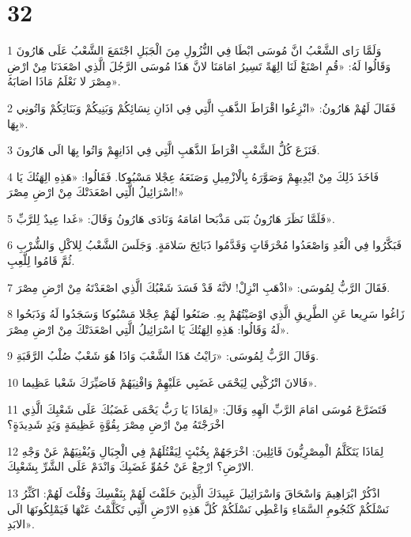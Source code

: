 \chapter{32}

\par 1 وَلَمَّا رَاى الشَّعْبُ انَّ مُوسَى ابْطَا فِي النُّزُولِ مِنَ الْجَبَلِ اجْتَمَعَ الشَّعْبُ عَلَى هَارُونَ وَقَالُوا لَهُ: «قُمِ اصْنَعْ لَنَا الِهَةً تَسِيرُ امَامَنَا لانَّ هَذَا مُوسَى الرَّجُلَ الَّذِي اصْعَدَنَا مِنْ ارْضِ مِصْرَ لا نَعْلَمُ مَاذَا اصَابَهُ».
\par 2 فَقَالَ لَهُمْ هَارُونُ: «انْزِعُوا اقْرَاطَ الذَّهَبِ الَّتِي فِي اذَانِ نِسَائِكُمْ وَبَنِيكُمْ وَبَنَاتِكُمْ وَاتُونِي بِهَا».
\par 3 فَنَزَعَ كُلُّ الشَّعْبِ اقْرَاطَ الذَّهَبِ الَّتِي فِي اذَانِهِمْ وَاتُوا بِهَا الَى هَارُونَ.
\par 4 فَاخَذَ ذَلِكَ مِنْ ايْدِيهِمْ وَصَوَّرَهُ بِالْازْمِيلِ وَصَنَعَهُ عِجْلا مَسْبُوكا. فَقَالُوا: «هَذِهِ الِهَتُكَ يَا اسْرَائِيلُ الَّتِي اصْعَدَتْكَ مِنْ ارْضِ مِصْرَ!»
\par 5 فَلَمَّا نَظَرَ هَارُونُ بَنَى مَذْبَحا امَامَهُ وَنَادَى هَارُونُ وَقَالَ: «غَدا عِيدٌ لِلرَّبِّ».
\par 6 فَبَكَّرُوا فِي الْغَدِ وَاصْعَدُوا مُحْرَقَاتٍ وَقَدَّمُوا ذَبَائِحَ سَلامَةٍ. وَجَلَسَ الشَّعْبُ لِلاكْلِ وَالشُّرْبِ ثُمَّ قَامُوا لِلَّعِبِ.
\par 7 فَقَالَ الرَّبُّ لِمُوسَى: «اذْهَبِ انْزِلْ! لانَّهُ قَدْ فَسَدَ شَعْبُكَ الَّذِي اصْعَدْتَهُ مِنْ ارْضِ مِصْرَ.
\par 8 زَاغُوا سَرِيعا عَنِ الطَّرِيقِ الَّذِي اوْصَيْتُهُمْ بِهِ. صَنَعُوا لَهُمْ عِجْلا مَسْبُوكا وَسَجَدُوا لَهُ وَذَبَحُوا لَهُ وَقَالُوا: هَذِهِ الِهَتُكَ يَا اسْرَائِيلُ الَّتِي اصْعَدَتْكَ مِنْ ارْضِ مِصْرَ».
\par 9 وَقَالَ الرَّبُّ لِمُوسَى: «رَايْتُ هَذَا الشَّعْبَ وَاذَا هُوَ شَعْبٌ صُلْبُ الرَّقَبَةِ.
\par 10 فَالانَ اتْرُكْنِي لِيَحْمَى غَضَبِي عَلَيْهِمْ وَافْنِيَهُمْ فَاصَيِّرَكَ شَعْبا عَظِيما».
\par 11 فَتَضَرَّعَ مُوسَى امَامَ الرَّبِّ الَهِهِ وَقَالَ: «لِمَاذَا يَا رَبُّ يَحْمَى غَضَبُكَ عَلَى شَعْبِكَ الَّذِي اخْرَجْتَهُ مِنْ ارْضِ مِصْرَ بِقُوَّةٍ عَظِيمَةٍ وَيَدٍ شَدِيدَةٍ؟
\par 12 لِمَاذَا يَتَكَلَّمُ الْمِصْرِيُّونَ قَائِلِينَ: اخْرَجَهُمْ بِخُبْثٍ لِيَقْتُلَهُمْ فِي الْجِبَالِ وَيُفْنِيَهُمْ عَنْ وَجْهِ الارْضِ؟ ارْجِعْ عَنْ حُمُوِّ غَضَبِكَ وَانْدَمْ عَلَى الشَّرِّ بِشَعْبِكَ.
\par 13 اذْكُرْ ابْرَاهِيمَ وَاسْحَاقَ وَاسْرَائِيلَ عَبِيدَكَ الَّذِينَ حَلَفْتَ لَهُمْ بِنَفْسِكَ وَقُلْتَ لَهُمْ: اكَثِّرُ نَسْلَكُمْ كَنُجُومِ السَّمَاءِ وَاعْطِي نَسْلَكُمْ كُلَّ هَذِهِ الارْضِ الَّتِي تَكَلَّمْتُ عَنْهَا فَيَمْلِكُونَهَا الَى الابَدِ».
